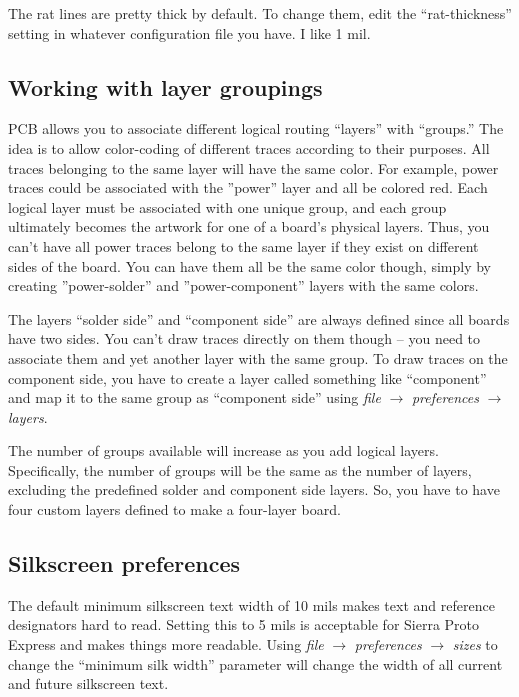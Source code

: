 The rat lines are pretty thick by default.  To change them, edit the ``rat-thickness'' setting in whatever configuration file you have.  I like 1 mil.




\subsection{Working with layer groupings}
PCB allows you to associate different logical routing ``layers'' with ``groups.''  The idea is to allow color-coding of different traces according to their purposes.  All traces belonging to the same layer will have the same color.  For example, power traces could be associated with the ''power'' layer and all be colored red.  Each logical layer must be associated with one unique group, and each group ultimately becomes the artwork for one of a board's physical layers.  Thus, you can't have all power traces belong to the same layer if they exist on different sides of the board.  You can have them all be the same color though, simply by creating ''power-solder'' and ''power-component'' layers with the same colors.  

The layers ``solder side'' and ``component side'' are always defined since all boards have two sides.  You can't draw traces directly on them though -- you need to associate them and yet another layer with the same group.  To draw traces on the component side, you have to create a layer called something like ``component'' and map it to the same group as ``component side'' using \textsl{file} $\rightarrow$ \textsl{preferences} $\rightarrow$ \textsl{layers}.  

The number of groups available will increase as you add logical layers.  Specifically, the number of groups will be the same as the number of layers, excluding the predefined solder and component side layers.  So, you have to have four custom layers defined to make a four-layer board.   


\subsection{Silkscreen preferences}
The default minimum silkscreen text width of 10 mils makes text and reference designators hard to read.  Setting this to 5 mils is acceptable for Sierra Proto Express and makes things more readable.  Using \textsl{file} $\rightarrow$ \textsl{preferences} $\rightarrow$ \textsl{sizes} to change the ``minimum silk width'' parameter will change the width of all current and future silkscreen text.


